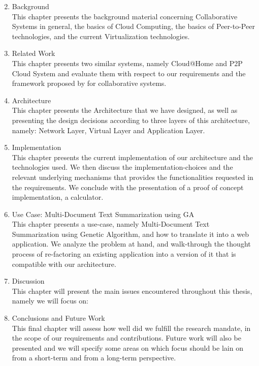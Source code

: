 \documentclass[12pt, titlepage]{uo_temp}
\begin{document}
     \begin{enumerate}[label={\bf Chapter \arabic*}, 
                       wide=\parindent,
                       leftmargin=\parindent, 
                       rightmargin=\parindent]
     \setcounter{enumi}{1}
     \item Background\\ 
       This chapter presents the background material concerning
       Collaborative Systems in general, the basics of Cloud Computing, the basics of
       Peer-to-Peer technologies, and the current Virtualization technologies.
     \item Related Work\\ 
       This chapter presents two similar systems, namely Cloud@Home
       and P2P Cloud System and evaluate them with respect to our requirements and the
       framework proposed by \cite{p2p_collab} for collaborative
       systems.
     \item Architecture\\
       This chapter presents the Architecture that we have designed, as well as
       presenting the design decisions according to three layers of this architecture,
       namely: Network Layer, Virtual Layer and Application Layer.
     \item Implementation\\ 
       This chapter presents the current implementation of our
       architecture and the technologies used. We then discuss the implementation-choices
       and the relevant underlying mechanisms that provides the functionalities requested
       in the requirements. We conclude with the presentation of a proof of concept
       implementation, a calculator.
     \item Use Case: Multi-Document Text Summarization using GA\\ 
       This chapter presents a use-case, namely Multi-Document Text Summarization using
       Genetic Algorithm, and how to translate it into a web application. We analyze the
       problem at hand, and walk-through the thought process of re-factoring an existing
       application into a version of it that is compatible with our architecture.
     \item Discussion\\
       This chapter will present the main issues encountered throughout this thesis,
       namely we will focus on: 
     \item Conclusions and Future Work\\
       This final chapter will assess how well did we fulfill the research mandate, in the
       scope of our requirements and contributions. Future work will also be presented and
       we will specify some areas on which focus should be lain on from a short-term and
       from a long-term perspective.

     \end{enumerate}
\end{document}
